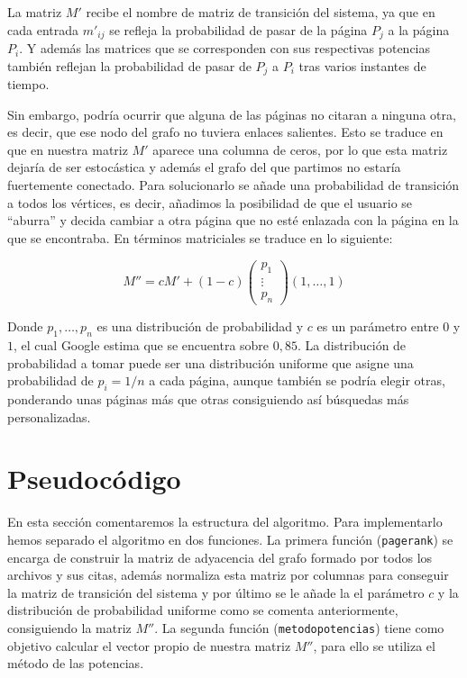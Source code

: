 \documentclass[size=a4, parskip=half, titlepage=false, toc=flat, toc=bib, 12pt]{scrartcl}
\theoremstyle{theorem-style}
\theoremstyle{definition-style}
\theoremstyle{remark-style}
\theoremstyle{example-style}
\theoremstyle{definition-style}
\theoremstyle{remark-style}
\begin{document}
La matriz $M'$ recibe el nombre de matriz de transición del sistema, ya que en cada entrada $m'_{ij}$ se refleja la probabilidad de pasar de la página $P_j$ a la página $P_i$. Y además las matrices que se corresponden con sus respectivas potencias también reflejan la probabilidad de pasar de $P_j$ a $P_i$ tras varios instantes de tiempo.

Sin embargo, podría ocurrir que alguna de las páginas no citaran a ninguna otra, es decir, que ese nodo del grafo no tuviera enlaces salientes. Esto se traduce en que en nuestra matriz $M'$ aparece una columna de ceros, por lo que esta matriz dejaría de ser estocástica y además el grafo del que partimos no estaría fuertemente conectado. Para solucionarlo se añade una probabilidad de transición a todos los vértices, es decir, añadimos la posibilidad de que el usuario se ``aburra'' y decida cambiar a otra página que no esté enlazada con la página en la que se encontraba. En términos matriciales se traduce en lo siguiente:

$$M'' = cM' + (1-c)\begin{pmatrix}
p_1 \\
\vdots \\
p_n \end{pmatrix} (1, \dots, 1)$$

Donde $p_1, \dots , p_n$ es una distribución de probabilidad y $c$ es un parámetro entre $0$ y $1$, el cual Google estima que se encuentra sobre $0,85$. La distribución de probabilidad a tomar puede ser una distribución uniforme que asigne una probabilidad de $p_i = 1/n$ a cada página, aunque también se podría elegir otras, ponderando unas páginas más que otras consiguiendo así búsquedas más personalizadas.

\newpage

\section{Pseudocódigo}
En esta sección comentaremos la estructura del algoritmo. Para implementarlo hemos separado el algoritmo en dos funciones. La primera función (\verb|pagerank|) se encarga de construir la matriz de adyacencia del grafo formado por todos los archivos y sus citas, además normaliza esta matriz por columnas para conseguir la matriz de transición del sistema y por último se le añade la el parámetro $c$ y la distribución de probabilidad uniforme como se comenta anteriormente, consiguiendo la matriz $M''$. La segunda función (\verb|metodopotencias|) tiene como objetivo calcular el vector propio de nuestra matriz $M''$, para ello se utiliza el método de las potencias.
\end{document}

